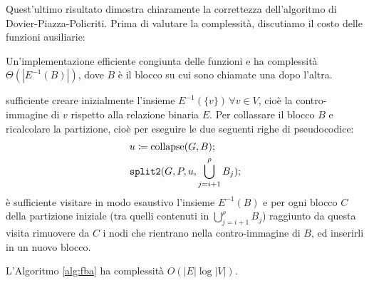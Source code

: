 Quest'ultimo risultato dimostra chiaramente la correttezza dell'algoritmo di Dovier-Piazza-Policriti. Prima di valutare la complessità, discutiamo il costo delle funzioni ausiliarie:
\begin{observation}
    Un'implementazione efficiente congiunta delle funzioni  e  ha complessità $\Theta(|E^{-1}(B)|)$, dove $B$ è il blocco su cui sono chiamate una dopo l'altra.
\end{observation}
\begin{proof2}
    \accente sufficiente creare inizialmente l'insieme $E^{-1}(\{v\}) \, \forall v \in V$, cioè la contro-immagine di $v$ rispetto alla relazione binaria $E$. Per collassare il blocco $B$ e ricalcolare la partizione, cioè per eseguire le due seguenti righe di pseudocodice:
    \begin{align*}
        &u \coloneqq \textup{collapse}(G,B);\\
        &\texttt{\textup{split2}}(G, P, u, \bigcup_{j=i+1}^\rho B_j);
    \end{align*}
    è sufficiente visitare in modo esaustivo l'insieme $E^{-1}(B)$ e per ogni blocco $C$ della partizione iniziale (tra quelli contenuti in $\bigcup_{j=i+1}^\rho B_j$) raggiunto da questa visita rimuovere da $C$ i nodi che rientrano nella contro-immagine di $B$, ed inserirli in un nuovo blocco.
\end{proof2}
\begin{theorem}
    L'Algoritmo \ref{alg:fba} ha complessità $O(|E| \log |V|)$.
\end{theorem}
